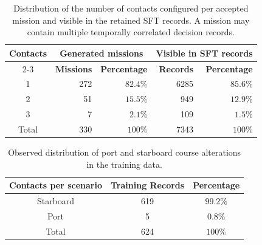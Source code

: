 \documentclass[10pt]{reportMaster}
\begin{document}
\begin{table}[htbp]
    \centering
    \begin{tabular}{c rr rr}
        \hline
        \textbf{Contacts} &
        \multicolumn{2}{c}{\textbf{Generated missions}} &
        \multicolumn{2}{c}{\textbf{Visible in SFT records}} \\
        \cline{2-3}\cline{4-5}
        & \textbf{Missions} & \textbf{Percentage}
        & \textbf{Records} & \textbf{Percentage} \\
        \hline
        1 & 272 & $82.4\%$ & 6285 & $85.6\%$ \\
        2 & 51  & $15.5\%$ & 949  & $12.9\%$ \\
        3 & 7   & $2.1\%$  & 109  & $1.5\%$ \\
        \hline
        Total & 330 & $100\%$ & 7343 & $100\%$ \\
        \hline
    \end{tabular}
    \caption{Distribution of the number of contacts configured per accepted
    mission and visible in the retained SFT records. A mission may contain
    multiple temporally correlated decision records.}
    \label{tab:generated_contact_count_distribution}
\end{table}

\begin{table}[htbp]
    \centering
    \begin{tabular}{c c c}
        \hline
        \textbf{Contacts per scenario} & \textbf{Training Records} &
        \textbf{Percentage} \\
        \hline
        Starboard & 619 & $99.2\%$ \\
        Port & 5 & $0.8\%$ \\
        \hline
        Total & 624 & $100\%$ \\
        \hline
    \end{tabular}
    \caption{Observed distribution of port and starboard course alterations in the training data.}
    \label{tab:generated_left_right}
\end{table}
\end{document}

